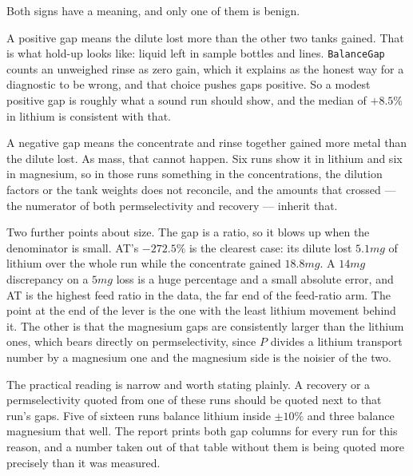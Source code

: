 Both signs have a meaning, and only one of them is benign.

A positive gap means the dilute lost more than the other two tanks gained. That is what
hold-up looks like: liquid left in sample bottles and lines. \texttt{BalanceGap} counts an
unweighed rinse as zero gain, which it explains as the honest way for a diagnostic to be
wrong, and that choice pushes gaps positive. So a modest positive gap is roughly what a
sound run should show, and the median of $+8.5\%$ in lithium is consistent with that.

A negative gap means the concentrate and rinse together gained more metal than the dilute
lost. As mass, that cannot happen. Six runs show it in lithium and six in magnesium, so in
those runs something in the concentrations, the dilution factors or the tank weights does
not reconcile, and the amounts that crossed --- the numerator of both permselectivity and
recovery --- inherit that.

Two further points about size. The gap is a ratio, so it blows up when the denominator is
small. AT's $-272.5\%$ is the clearest case: its dilute lost $5.1\unit{mg}$ of lithium
over the whole run while the concentrate gained $18.8\unit{mg}$. A $14\unit{mg}$
discrepancy on a $5\unit{mg}$ loss is a huge percentage and a small absolute error, and AT
is the highest feed ratio in the data, the far end of the feed-ratio arm. The point at the
end of the lever is the one with the least lithium movement behind it. The other is that
the magnesium gaps are consistently larger than the lithium ones, which bears directly on
permselectivity, since $P$ divides a lithium transport number by a magnesium one and the
magnesium side is the noisier of the two.

The practical reading is narrow and worth stating plainly. A recovery or a permselectivity
quoted from one of these runs should be quoted next to that run's gaps. Five of sixteen
runs balance lithium inside $\pm 10\%$ and three balance magnesium that well. The report
prints both gap columns for every run for this reason, and a number taken out of that
table without them is being quoted more precisely than it was measured.
